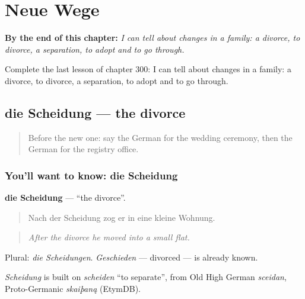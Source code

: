 
\chapter{Neue Wege}
\label{ch:ge-neue-wege}

\begin{chapteropening}
\textbf{By the end of this chapter:} \emph{I can tell about changes in a family: a divorce, to divorce, a separation, to adopt and to go through.}

Complete the last lesson of chapter 300: I can tell about changes in a family: a divorce, to divorce, a separation, to adopt and to go through.
\end{chapteropening}

\section[die Scheidung]{die Scheidung — the divorce}

\label{lesson:GE-C300-scheidung}



\begin{quote}
Before the new one: say the German for the wedding ceremony, then the German for the registry office.
\end{quote}

\subsection*{You'll want to know: die Scheidung}
\textbf{die Scheidung} — \textquotedblleft{}the divorce\textquotedblright{}.

\begin{quote}
Nach der Scheidung zog er in eine kleine Wohnung.
\end{quote}

\begin{quote}
\emph{After the divorce he moved into a small flat.}
\end{quote}

Plural: \emph{die Scheidungen}. \emph{Geschieden} — divorced — is already known.

\begin{cousinweb}
\emph{Scheidung} is built on \emph{scheiden} \textquotedblleft{}to separate\textquotedblright{}, from Old High German \emph{sceidan}, Proto-Germanic \emph{skaiþaną} (EtymDB).
\end{cousinweb}

